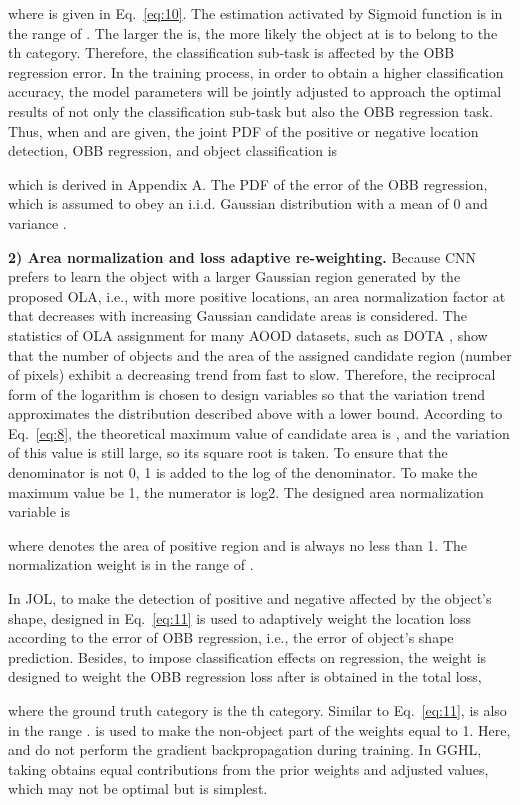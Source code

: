 where  is given in Eq.~\ref{eq:10}. The estimation  activated by Sigmoid function is in the range of . The larger the  is, the more likely the object at  is to belong to the th category. Therefore, the classification sub-task is affected by the OBB regression error. In the training process, in order to obtain a higher classification accuracy, the model parameters will be jointly adjusted to approach the optimal results of not only the classification sub-task but also the OBB regression task. Thus, when  and  are given, the joint PDF of the positive or negative location detection, OBB regression, and object classification is

which is derived in Appendix A. The PDF of the error of the OBB regression, which is assumed to obey an i.i.d. Gaussian distribution with a mean of 0 and variance . 

\textbf{2) Area normalization and loss adaptive re-weighting.} Because CNN prefers to learn the object with a larger Gaussian region generated by the proposed OLA, i.e., with more positive locations, an area normalization factor  at  that decreases with increasing Gaussian candidate areas is considered. The statistics of OLA assignment for many AOOD datasets, such as DOTA \cite{xiaDOTALargeScaleDataset2018}, show that the number of objects and the area of the assigned candidate region (number of pixels) exhibit a decreasing trend from fast to slow. Therefore, the reciprocal form of the logarithm is chosen to design variables  so that the variation trend approximates the distribution described above with a lower bound. According to Eq.~\ref{eq:8}, the theoretical maximum value of candidate area is , and the variation of this value is still large, so its square root is taken. To ensure that the denominator is not 0, 1 is added to the log of the denominator. To make the maximum value be 1, the numerator is log2. The designed area normalization variable is

where  denotes the area of positive region and is always no less than 1. The normalization weight is in the range of .

In JOL, to make the detection of positive and negative affected by the object’s shape,  designed in Eq.~\ref{eq:11} is used to adaptively weight the location loss according to the error of OBB regression, i.e., the error of object’s shape prediction. Besides, to impose classification effects on regression, the weight  is designed to weight the OBB regression loss after  is obtained in the total loss,

where the ground truth category is the th category. Similar to Eq.~\ref{eq:11},  is also in the range .  is used to make the non-object part of the weights equal to 1. Here,  and  do not perform the gradient backpropagation during training. In GGHL, taking  obtains equal contributions from the prior weights and adjusted values, which may not be optimal but is simplest.

